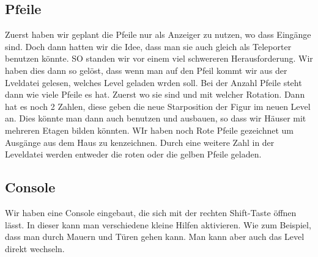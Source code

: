 \documentclass[11pt,a4paper]{scrbook}
\begin{document}
\subsection{Pfeile}
Zuerst haben wir geplant die Pfeile nur als Anzeiger zu nutzen, wo dass Eingänge sind. Doch dann hatten wir die Idee, dass man sie auch gleich als Teleporter benutzen könnte. SO standen wir vor einem viel schwereren Herausforderung. Wir haben dies dann so gelöst, dass wenn man auf den Pfeil kommt wir aus der Lveldatei gelesen, welches Level geladen wrden soll. Bei der Anzahl Pfeile steht dann wie viele Pfeile es hat. Zuerst wo sie sind und mit welcher Rotation. Dann hat es noch 2 Zahlen, diese geben die neue Starposition der Figur im neuen Level an. Dies könnte man dann auch benutzen und ausbauen, so dass wir Häuser mit mehreren Etagen bilden könnten. WIr haben noch Rote Pfeile gezeichnet um Ausgänge aus dem Haus zu kenzeichnen. Durch eine weitere Zahl in der Leveldatei werden entweder die roten oder die gelben Pfeile geladen.

\subsection{Console}
Wir haben eine Console eingebaut, die sich mit der rechten Shift-Taste öffnen lässt. In dieser kann man verschiedene kleine Hilfen aktivieren. Wie zum Beispiel, dass man durch Mauern und Türen gehen kann. Man kann aber auch das Level direkt wechseln.
\end{document}
